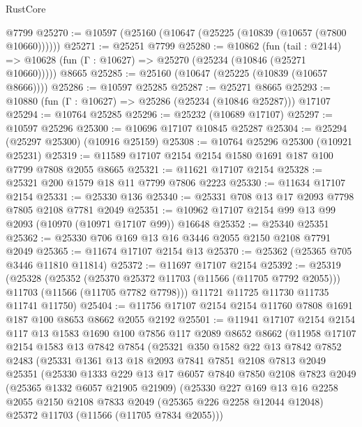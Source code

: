 \begin{lexlean}{RustCore}
\begin{coremodule}
    @7799
@25270 := @10597 (@25160 (@10647 (@25225 (@10839 (@10657 (@7800 @10660))))))
@25271 := @25251 @7799
@25280 := @10862
    (fun (tail : @2144) => @10628 (fun (Γ : @10627) => @25270 (@25234 (@10846 (@25271 @10660)))))
    @8665
@25285 := @25160 (@10647 (@25225 (@10839 (@10657 @8666))))
@25286 := @10597 @25285
@25287 := @25271 @8665
@25293 := @10880 (fun (Γ : @10627) => @25286 (@25234 (@10846 @25287))) @17107
@25294 := @10764 @25285
@25296 := @25232 (@10689 @17107)
@25297 := @10597 @25296
@25300 := @10696 @17107 @10845 @25287
@25304 := @25294 (@25297 @25300) (@10916 @25159)
@25308 := @10764 @25296 @25300 (@10921 @25231)
@25319 := @11589 @17107 @2154 @2154 @1580 @1691 @187 @100 @7799 @7808 @2055 @8665
@25321 := @11621 @17107 @2154
@25328 := @25321 @200 @1579 @18 @11 @7799 @7806 @2223
@25330 := @11634 @17107 @2154
@25331 := @25330 @136
@25340 := @25331 @708 @13 @17 @2093 @7798 @7805 @2108 @7781 @2049
@25351 := @10962 @17107 @2154 @99 @13 @99 @2093 (@10970 (@10971 @17107 @99)) @16648
@25352 := @25340 @25351
@25362 := @25330 @706 @169 @13 @16 @3446 @2055 @2150 @2108 @7791 @2049
@25365 := @11674 @17107 @2154 @13
@25370 := @25362 (@25365 @705 @3446 @11810 @11814)
@25372 := @11697 @17107 @2154
@25392 := @25319
    (@25328
      (@25352
        (@25370 @25372 @11703 (@11566 (@11705 @7792 @2055)))
        @11703
        (@11566 (@11705 @7782 @7798)))
      @11721
      @11725
      @11730
      @11735
      @11741
      @11750)
@25404 := @11756 @17107 @2154 @2154 @11760 @7808 @1691 @187 @100 @8653 @8662 @2055 @2192
@25501 := @11941
    @17107
    @2154
    @2154
    @117
    @13
    @1583
    @1690
    @100
    @7856
    @117
    @2089
    @8652
    @8662
    (@11958
      @17107
      @2154
      @1583
      @13
      @7842
      @7854
      (@25321
        @350
        @1582
        @22
        @13
        @7842
        @7852
        @2483
        (@25331
          @1361
          @13
          @18
          @2093
          @7841
          @7851
          @2108
          @7813
          @2049
          @25351
          (@25330
            @1333
            @229
            @13
            @17
            @6057
            @7840
            @7850
            @2108
            @7823
            @2049
            (@25365 @1332 @6057 @21905 @21909)
            (@25330
              @227
              @169
              @13
              @16
              @2258
              @2055
              @2150
              @2108
              @7833
              @2049
              (@25365 @226 @2258 @12044 @12048)
              @25372
              @11703
              (@11566 (@11705 @7834 @2055)))

\end{coremodule}
\end{lexlean}
